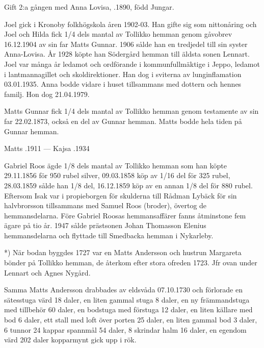 Gift 2:a gången med Anna Lovisa, .1890, född Jungar.
\begin{jhchildren}
  \item {}
  \item {}
  \item {}
\end{jhchildren}
Joel gick i Kronoby folkhögskola åren 1902-03. Han gifte sig som nittonåring och Joel och Hilda fick 1/4 dels mantal av Tollikko hemman genom gåvobrev 16.12.1904 av sin far Matts Gunnar. 1906 sålde han en tredjedel till sin syster Anna-Lovisa. År 1928 köpte han Södergård hemman till äldsta sonen Lennart. Joel var många år ledamot och ordförande i kommunfullmäktige i Jeppo, ledamot i 	lantmannagillet och skoldirektioner. Han dog i sviterna av lunginflamation 03.01.1935. Anna bodde vidare i huset tillsammans med dottern och hennes familj. Hon dog 21.04.1979.


Matts Gunnar fick 1/4 dels mantal av Tollikko hemman genom testamente av sin far 22.02.1873, också en del av Gunnar hemman. Matts bodde hela tiden på Gunnar hemman.

Matts .1911  --- 	Kajsa .1934


Gabriel Roos ägde 1/8 dels mantal av Tollikko hemman som han köpte 29.11.1856 för 950 rubel silver, 09.03.1858 köp av 1/16 del för 325 	rubel, 28.03.1859 sålde han 1/8 del, 16.12.1859 köp av en annan 1/8 del för 880 rubel. Eftersom Isak var i propieborgen för skulderna till Rådman Lybäck för sin halvbrorsson tillsammans med Samuel Roos (broder), övertog de hemmansdelarna. Före Gabriel Roosas hemmansaffärer fanns åtminstone fem ägare på tio år. 1947 sålde prästsonen Johan Thomasson Elenius hemmansdelarna och flyttade till Smedbacka hemman i Nykarleby.

*) När bodan byggdes 1727 var en Matts Andersson och hustrun Margareta bönder på Tollikko hemman, de återkom efter stora ofreden 1723. Jfr ovan under Lennart och Agnes Nygård.

Samma Matts Andersson drabbades av eldsvåda 07.10.1730 och förlorade en sätesstuga värd 18 daler, en liten gammal stuga 8 daler, en ny främmandstuga med tillbehör 60 daler, en bodstuga med förstuga 12 daler, en liten källare med bod 6 daler, ett stall med loft över porten 25 daler, en liten gammal bod 3 daler, 6 tunnor 24 kappar spannmål 54 daler, 8 skrindar halm 16 daler, en egendom värd 202 daler kopparmynt gick upp i rök.



